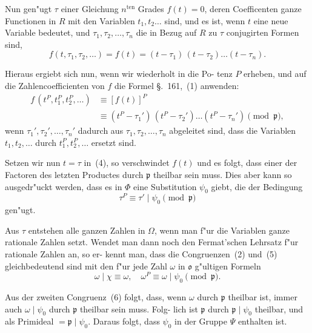 \documentclass[12pt,a4paper]{article}
\theoremstyle{weber}
\begin{document}
Nun gen"ugt $\tau$ einer Gleichung $n^{\mathrm{ten}}$ Grades $f(t) = 0$, deren
Coefficenten ganze Functionen in $R$ mit den Variablen $t_1, t_2 \dots$
sind, und es ist, wenn $t$ eine neue Variable bedeutet, und
$\tau_1, \tau_2, \dots, \tau_n$ die in Bezug auf $R$ zu $\tau$ conjugirten Formen sind,
\begin{equation}\label{eq:s162-3}
f(t, \tau_1, \tau_2, \dots) = f(t) = (t-\tau_1)\,(t-\tau_2)\dots(t-\tau_n).
\end{equation}

Hieraus ergiebt sich nun, wenn wir wiederholt in die Po-
tenz $P$ erheben, und auf die Zahlencoefficienten von $f$ die Formel
\S.~161,~(1) anwenden:
\begin{equation}\label{eq:s162-4}
\begin{aligned}
f\,(t^P, t_1^P, t_2^P, \dots) &\equiv [f(t)]^P \\
&\equiv (t^P-\tau_1')\,(t^P-\tau_2')\dots(t^P-\tau_n') \pmod{\mathfrak{p}},
\end{aligned}
\end{equation}
wenn $\tau_1', \tau_2', \dots, \tau_n'$ dadurch aus $\tau_1, \tau_2, \dots, \tau_n$ abgeleitet sind, dass
die Variablen $t_1, t_2, \dots$ durch $t_1^P, t_2^P, \dots$ ersetzt sind.

Setzen wir nun $t = \tau$ in~(4), so verschwindet $f(t)$ und es
folgt, dass einer der Factoren des letzten Productes durch $\mathfrak{p}$
theilbar sein muss. Dies aber kann so ausgedr"uckt werden, dass
es in $\varPhi$ eine Substitution $\psi_0$ giebt, die der Bedingung
\begin{equation}\label{eq:s162-5}
\tau^P \equiv \tau' \mid \psi_0 \pmod{\mathfrak{p}}
\end{equation}
gen"ugt.

Aus $\tau$ entstehen alle ganzen Zahlen in $\varOmega$, wenn man f"ur
die Variablen ganze rationale Zahlen setzt. Wendet man dann
noch den Fermat'schen Lehrsatz f"ur rationale Zahlen an, so er-
kennt man, dass die Congruenzen~(2) und~(5) gleichbedeutend
sind mit den f"ur jede Zahl $\omega$ in $\mathfrak{o}$ g"ultigen Formeln
\begin{equation}\label{eq:s162-6}
\omega \mid \chi \equiv \omega, \quad \omega^P \equiv \omega \mid \psi_0 \pmod{\mathfrak{p}}.
\end{equation}

Aus der zweiten Congruenz~(6) folgt, dass, wenn $\omega$ durch $\mathfrak{p}$
theilbar ist, immer auch $\omega \mid \psi_0$ durch $\mathfrak{p}$ theilbar sein muss. Folg-
lich ist $\mathfrak{p}$ durch $\mathfrak{p} \mid \psi_0$ theilbar, und als Primideal $= \mathfrak{p} \mid \psi_0$. Daraus
folgt, dass $\psi_0$ in der Gruppe $\varPsi$ enthalten ist.
\end{document}
